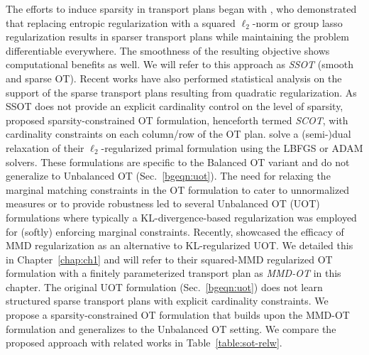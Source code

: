 The efforts to induce sparsity in transport plans began with \cite{blondel18a}, who demonstrated that replacing entropic regularization with a squared $\ell_2$-norm or group lasso regularization results in sparser transport plans while maintaining the problem differentiable everywhere. The smoothness of the resulting objective shows computational benefits as well. We will refer to this approach as \textit{SSOT} (smooth and sparse OT). Recent works \citep{wiesel2024sparsityquadraticallyregularizedoptimal,gonzálezsanz2024sparsityquadraticallyregularizedoptimal} have also performed statistical analysis on the support of the sparse transport plans resulting from quadratic regularization. As SSOT does not provide an explicit cardinality control on the level of sparsity, \cite{liu2023sparsityconstrained} proposed sparsity-constrained OT formulation, henceforth termed \textit{SCOT}, with cardinality constraints on each column/row of the OT plan. \cite{liu2023sparsityconstrained} solve a (semi-)dual relaxation of their $\ell_2$-regularized primal formulation using the LBFGS \citep{LBFGS} or ADAM \citep{KingBa15} solvers. These formulations are specific to the Balanced OT variant and do not generalize to Unbalanced OT (Sec.~\ref{bgeqn:uot}).
The need for relaxing the marginal matching constraints in the OT formulation to cater to unnormalized measures \citep{Liero2018,ChizatPSV18} or to provide robustness \citep{Frogner15,jumbot,ROT} led to several Unbalanced OT (UOT) formulations where typically a KL-divergence-based regularization was employed for (softly) enforcing marginal constraints. Recently, \cite{mmd-uot} showcased the efficacy of MMD regularization as an alternative to KL-regularized UOT. We detailed this in Chapter~\ref{chap:ch1} and will refer to their squared-MMD regularized OT formulation with a finitely parameterized transport plan as \textit{MMD-OT} in this chapter. The original UOT formulation (Sec.~\ref{bgeqn:uot}) does not learn structured sparse transport plans with explicit cardinality constraints. We propose a sparsity-constrained OT formulation that builds upon the MMD-OT formulation and generalizes to the Unbalanced OT setting. We compare the proposed approach with related works in Table~\ref{table:sot-relw}.

